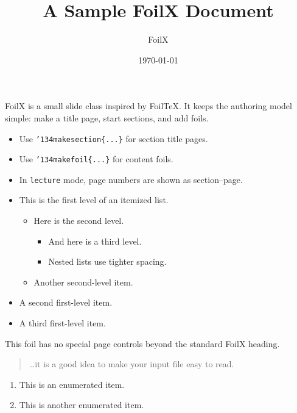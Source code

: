 \documentclass[lecture]{foilx}
\title{A Sample FoilX Document}
\author{FoilX}
\date{\today}
\newcommand{\bs}{\char '134}
\begin{document}
\maketitle


FoilX is a small slide class inspired by FoilTeX.  It keeps the authoring
model simple: make a title page, start sections, and add foils.

\begin{itemize}
  \item Use \texttt{\bs makesection\{...\}} for section title pages.
  \item Use \texttt{\bs makefoil\{...\}} for content foils.
  \item In \texttt{lecture} mode, page numbers are shown as
        section--page.
\end{itemize}

\begin{itemize}
  \item This is the first level of an itemized list.
    \begin{itemize}
      \item Here is the second level.
        \begin{itemize}
          \item And here is a third level.
          \item Nested lists use tighter spacing.
        \end{itemize}
      \item Another second-level item.
    \end{itemize}
  \item A second first-level item.
  \item A third first-level item.
\end{itemize}

This foil has no special page controls beyond the standard FoilX heading.

\begin{quote}
\ldots it is a good idea to make your input file easy to read.
\end{quote}

\begin{enumerate}
  \item This is an enumerated item.
  \item This is another enumerated item.
\end{enumerate}
\end{document}
